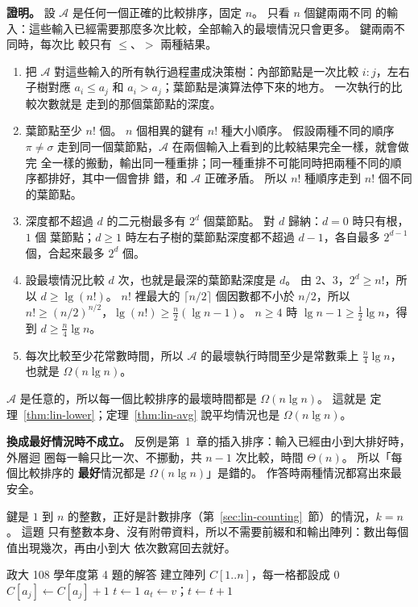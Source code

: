 \textbf{證明。} 設 $\mathcal{A}$ 是任何一個正確的比較排序，固定 $n$。 只看 $n$ 個鍵兩兩不同
的輸入：這些輸入已經需要那麼多次比較，全部輸入的最壞情況只會更多。 鍵兩兩不同時，每次比
較只有 $\le$、$>$ 兩種結果。
\begin{enumerate}
\item 把 $\mathcal{A}$ 對這些輸入的所有執行過程畫成決策樹：內部節點是一次比較 $i{:}j$，左右
子樹對應 $a_i \le a_j$ 和 $a_i > a_j$；葉節點是演算法停下來的地方。 一次執行的比較次數就是
走到的那個葉節點的深度。
\item 葉節點至少 $n!$ 個。 $n$ 個相異的鍵有 $n!$ 種大小順序。 假設兩種不同的順序
$\pi \ne \sigma$ 走到同一個葉節點，$\mathcal{A}$ 在兩個輸入上看到的比較結果完全一樣，就會做完
全一樣的搬動，輸出同一種重排；同一種重排不可能同時把兩種不同的順序都排好，其中一個會排
錯，和 $\mathcal{A}$ 正確矛盾。 所以 $n!$ 種順序走到 $n!$ 個不同的葉節點。
\item 深度都不超過 $d$ 的二元樹最多有 $2^d$ 個葉節點。 對 $d$ 歸納：$d = 0$ 時只有根，$1$ 個
葉節點；$d \ge 1$ 時左右子樹的葉節點深度都不超過 $d - 1$，各自最多 $2^{d-1}$ 個，合起來最多
$2^d$ 個。
\item 設最壞情況比較 $d$ 次，也就是最深的葉節點深度是 $d$。 由 2、3，$2^d \ge n!$，所以
$d \ge \lg(n!)$。 $n!$ 裡最大的 $\lceil n/2 \rceil$ 個因數都不小於 $n/2$，所以
$n! \ge (n/2)^{n/2}$，$\lg(n!) \ge \frac{n}{2}(\lg n - 1)$。 $n \ge 4$ 時
$\lg n - 1 \ge \frac{1}{2}\lg n$，得到 $d \ge \frac{n}{4}\lg n$。
\item 每次比較至少花常數時間，所以 $\mathcal{A}$ 的最壞執行時間至少是常數乘上 $\frac{n}{4}\lg n$，
也就是 $\Omega(n \lg n)$。
\end{enumerate}
$\mathcal{A}$ 是任意的，所以每一個比較排序的最壞時間都是 $\Omega(n \lg n)$。 這就是
定理~\ref{thm:lin-lower}；定理~\ref{thm:lin-avg} 說平均情況也是 $\Omega(n \lg n)$。

\textbf{換成最好情況時不成立。} 反例是第~1~章的插入排序：輸入已經由小到大排好時，外層迴
圈每一輪只比一次、不挪動，共 $n - 1$ 次比較，時間 $\Theta(n)$。 所以「每個比較排序的
\textbf{最好}情況都是 $\Omega(n \lg n)$」是錯的。 作答時兩種情況都寫出來最安全。

鍵是 $1$ 到 $n$ 的整數，正好是計數排序（第~\ref{sec:lin-counting}~節）的情況，$k = n$。 這題
只有整數本身、沒有附帶資料，所以不需要前綴和和輸出陣列：數出每個值出現幾次，再由小到大
依次數寫回去就好。

\begin{pseudo}{政大 108 學年度第 4 題的解答}
    \State 建立陣列 $C[1..n]$，每一格都設成 $0$
        \State $C[a_j] \gets C[a_j] + 1$
    \EndFor
    \State $t \gets 1$ 
            \State $a_t \gets v$；$t \gets t + 1$
        \EndFor
    \EndFor
\EndProcedure
\end{pseudo}

